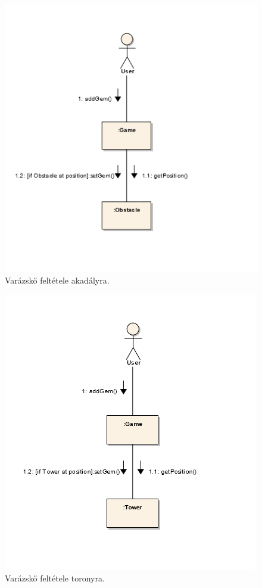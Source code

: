 \begin{figure}[H]
\begin{center}
\includegraphics{images/ch05/addGemToObKomm.png}
\caption{Varázskő feltétele akadályra.}
\label{fig:addGemToObKomm}
\end{center}
\end{figure}


\begin{figure}[H]
\begin{center}
\includegraphics{images/ch05/addGemToTowerKomm.png}
\caption{Varázskő feltétele toronyra.}
\label{fig:addGemToTowerKomm}
\end{center}
\end{figure}
